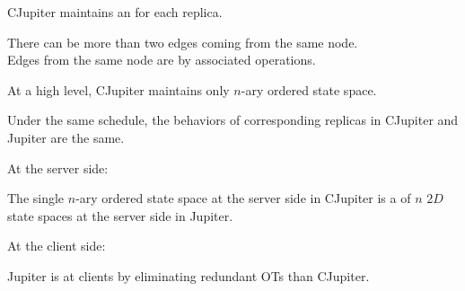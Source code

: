 
\begin{frame}{}
  \centerline{\Huge {}}
\end{frame}

\begin{frame}{}
  \begin{center}
    {\large CJupiter maintains an  for each replica.}
  \end{center}


  \begin{center} 
    \pause
    There can be more than two edges coming from the same node. \\[6pt]
    \pause
    Edges from the same node are  by associated operations.
  \end{center}
\end{frame}

\begin{frame}{}
  \begin{center}
    \begin{prop}[$n + 1 \to 1$ (Informal)]
      {\large At a high level, CJupiter maintains only  $n$-ary ordered state space.}
    \end{prop}

    \resizebox{0.50\textwidth}{!}{}

  \end{center}
\end{frame}

\begin{frame}{}
  \begin{Theorem}[Equivalence]
    Under the same schedule, the behaviors of corresponding replicas in CJupiter and Jupiter are the same.
  \end{Theorem}

  \pause
  \vspace{0.30cm}
  \centerline{\large At the server side:}
  \begin{prop}
    The single $n$-ary ordered state space at the server side in CJupiter 
    is a  of $n$ $2D$ state spaces at the server side in Jupiter.
  \end{prop}

  \vspace{0.30cm}
  \centerline{\large At the client side:}
  \begin{prop}
    Jupiter is  at clients by eliminating redundant OTs than CJupiter.
  \end{prop}
\end{frame}
